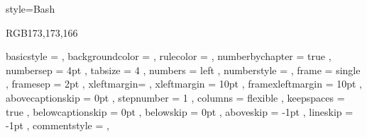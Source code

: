 {
    style=Bash
}


\definecolor{sublimegray} {RGB}{173,173,166}

{
    basicstyle       = 
    \ttfamily\color{sublimewhite}
    \lst@ifdisplaystyle\scriptsize\fi %
,   backgroundcolor  = \color{sublimeblack}
,   rulecolor        = \color{black}
,   numberbychapter  = true
,   numbersep        = 4pt
,   tabsize          =  4          
,   numbers          = left
,   numberstyle      = \renewcommand{\thelstnumber}{>}\tiny\color{sublimewhite}\noncopynumber
,   frame            = single
,   framesep         =  2pt
,   xleftmargin=\parindent
,   xleftmargin      = 10pt
,   framexleftmargin = 10pt
,   abovecaptionskip = 0pt
,   stepnumber       = 1
,   columns          = flexible
,   keepspaces       = true
,   belowcaptionskip = 0pt
,   belowskip        = 0pt
,   aboveskip        = -1pt
,   lineskip         = -1pt
,   commentstyle     = \color{sublimegray},
}
